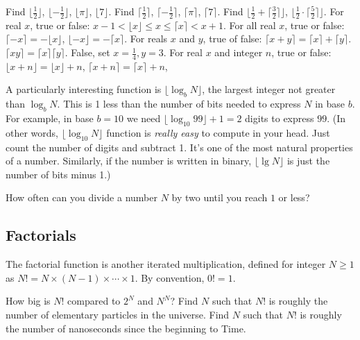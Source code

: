 \documentclass{tufte-handout}
\begin{document}
\begin{ExerciseList}
\Exercise Find $\lfloor \frac{1}{2}\rfloor$, $\lfloor
  -\frac{1}{2}\rfloor$,  $\lfloor \pi\rfloor$, $\lfloor 7\rfloor$.
\Exercise Find $\lceil \frac{1}{2}\rceil$, $\lceil
  -\frac{1}{2}\rceil$,  $\lceil \pi\rceil$, $\lceil 7\rceil$.
\Exercise Find
 $\lfloor \frac{1}{2}+\lceil \frac{3}{2}\rceil \rfloor$, 
 $\lfloor \frac{1}{2}\cdot \lceil \frac{5}{2}\rceil \rfloor$.
\Exercise For real $x$, true or false: $x-1<\lfloor x \rfloor \leq x \leq
  \lceil x\rceil < x+1$.
\Exercise For all real $x$, true or false: $\lceil -x\rceil = -\lfloor x\rfloor$,
  $\lfloor -x\rfloor = -\lceil x\rceil$.
\Exercise For reals $x$ and $y$, true of false: $\lceil x+y\rceil = \lceil
  x\rceil + \lceil y\rceil$. $\lceil xy\rceil =\lceil x\rceil \lceil
  y\rceil.$
  \Answer False, set $x=\frac{1}{4}, y=3$.
\Exercise For real $x$ and integer $n$, true or false:
  $\lfloor x+n\rfloor = \lfloor x\rfloor+n$,
  $\lceil x+n\rceil = \lceil x\rceil+n$,
\end{ExerciseList}

A particularly interesting function is $\lfloor \log_b N\rfloor$, the
largest integer not greater than $\log_b N$.  This is 1 less than the
number of bits needed to express $N$ in base $b$. For example, in base
$b=10$ we need $\lfloor \log_{10} 99\rfloor +1= 2$ digits to express
$99$. (In other words, $\lfloor \log_{10} N\rfloor$ function is
\emph{really easy} to compute in your head. Just count the number of
digits and subtract 1. It's one of the most natural properties of a
number. Similarly, if the number is written in binary, $\lfloor \lg N\rfloor$ is
just the number of bits minus 1.)

\begin{ExerciseList}
\Exercise How often can you divide a number $N$ by two until you reach $1$
  or less?
\end{ExerciseList}

\subsection{Factorials}

The factorial function is another iterated multiplication, defined for
integer $N\geq 1$ as $N!= N\times (N-1)\times \cdots \times 1$. By
convention, $0!=1$.


\begin{ExerciseList}
\Exercise How big is $N!$ compared to $2^N$ and $N^N$?
\Exercise Find $N$ such that $N!$ is roughly the number of elementary
  particles in the universe.
\Exercise Find $N$ such that $N!$ is roughly the number of nanoseconds
  since the beginning to Time.
\end{ExerciseList}
\end{document}
